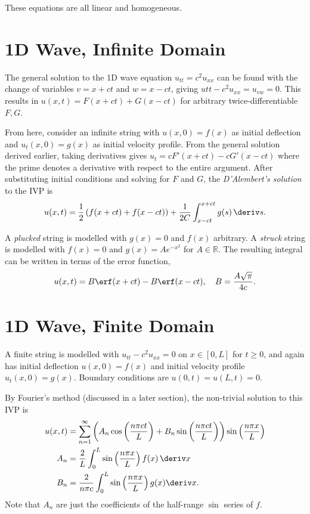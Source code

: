 \documentclass[10pt, a4paper]{article}
\begin{document}
\begin{landscape}
\begin{multicols*}{2}
    These equations are all linear and homogeneous.

    \section{1D Wave, Infinite Domain}

    The general solution to the 1D wave equation \(u_{tt} = c^2 u_{xx}\) can be found with the change of
    variables \(v = x + ct\) and \(w = x - ct\), giving \(u{tt} - c^2 u_{xx} = u_{vw} = 0\).
    This results in \(u(x, t) = F(x + ct) + G(x - ct)\) for arbitrary twice-differentiable \(F, G\).

    From here, consider an infinite string with \(u(x, 0) = f(x)\) as initial deflection
    and \(u_t(x, 0) = g(x)\) as initial velocity profile. From the general solution derived earlier,
    taking derivatives gives \(u_t = c F'(x+ct) - c G'(x - ct)\) where the prime denotes a derivative with
    respect to the entire argument. After substituting initial conditions and solving for \(F\) and \(G\),
    the \emph{D'Alembert's solution} to the IVP is
    \[
        u(x, t) = \frac{1}{2}\left(f(x + ct) + f(x - ct) \right)
        + \frac{1}{2C} \int_{x - ct}^{x + ct} g(s) \,\deriv s.
    \]

    A \emph{plucked} string is modelled with \(g(x) = 0\) and \(f(x)\) arbitrary.
    A \emph{struck} string is modelled with \(f(x) = 0\) and \(g(x) = A e^{-x^2}\) for \(A \in \mathbb{R}\).
    The resulting integral can be written in terms of the error function,
    \[
        u(x, t) = B \erf(x + ct) - B \erf(x - ct),
        \quad
        B = \frac{A \sqrt{\pi}}{4c}.
    \]

    \section{1D Wave, Finite Domain}

    A finite string is modelled with \(u_{tt} - c^2 u_{xx} = 0\) on \(x \in [0, L]\) for \(t \geq 0\),
    and again has initial deflection \(u(x, 0) = f(x)\) and initial velocity profile \(u_t(x, 0) = g(x)\).
    Boundary conditions are \(u(0, t) = u(L, t) = 0\).

    By Fourier's method (discussed in a later section), the non-trivial solution to this IVP is
    \begin{align*}
        u(x, t) &= \sum_{n=1}^{\infty} \left(
            A_n \cos\left(\frac{n \pi c t}{L}\right) + B_n \sin\left(\frac{n \pi ct}{L}\right)
        \right) \sin \left(\frac{n \pi x}{L}\right) \\
        A_n &= \frac{2}{L} \int_0^L \sin\left(\frac{n \pi x}{L}\right) f(x) \,\deriv x \\
        B_n &= \frac{2}{n \pi c} \int_0^L \sin\left(\frac{n \pi x}{L}\right) g(x) \deriv x.
    \end{align*}
    Note that \(A_n\) are just the coefficients of the half-range \(\sin\) series of \(f\).


\end{multicols*}
\end{landscape}
\end{document}
